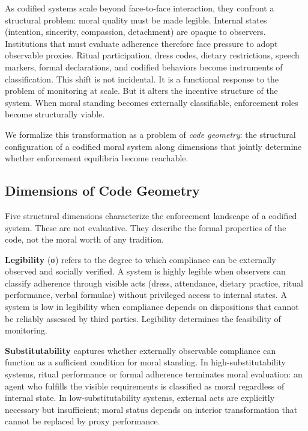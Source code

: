 \documentclass[12pt]{article}
\begin{document}
As codified systems scale beyond face-to-face interaction, they confront a structural problem: moral quality must be made legible. Internal states (intention, sincerity, compassion, detachment) are opaque to observers. Institutions that must evaluate adherence therefore face pressure to adopt observable proxies. Ritual participation, dress codes, dietary restrictions, speech markers, formal declarations, and codified behaviors become instruments of classification. This shift is not incidental. It is a functional response to the problem of monitoring at scale. But it alters the incentive structure of the system. When moral standing becomes externally classifiable, enforcement roles become structurally viable.

We formalize this transformation as a problem of \emph{code geometry}: the structural configuration of a codified moral system along dimensions that jointly determine whether enforcement equilibria become reachable.

%
\subsection{Dimensions of Code Geometry}

Five structural dimensions characterize the enforcement landscape of a codified system. These are not evaluative. They describe the formal properties of the code, not the moral worth of any tradition.

\textbf{Legibility} (σ) refers to the degree to which compliance can be externally observed and socially verified. A system is highly legible when observers can classify adherence through visible acts (dress, attendance, dietary practice, ritual performance, verbal formulae) without privileged access to internal states. A system is low in legibility when compliance depends on dispositions that cannot be reliably assessed by third parties. Legibility determines the feasibility of monitoring.

\textbf{Substitutability} captures whether externally observable compliance can function as a sufficient condition for moral standing. In high-substitutability systems, ritual performance or formal adherence terminates moral evaluation: an agent who fulfills the visible requirements is classified as moral regardless of internal state. In low-substitutability systems, external acts are explicitly necessary but insufficient; moral status depends on interior transformation that cannot be replaced by proxy performance.
\end{document}
